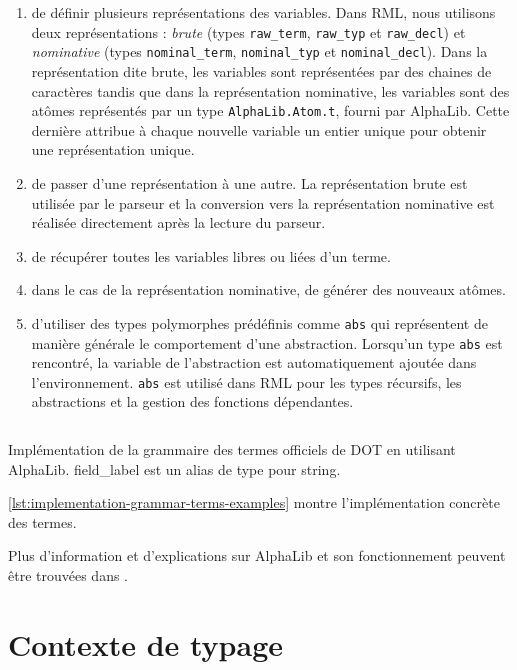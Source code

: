 \begin{enumerate}
  \item de définir plusieurs représentations des variables. Dans RML, nous utilisons deux
  représentations : \textit{brute} (types \verb|raw_term|,
  \verb|raw_typ| et \verb|raw_decl|) et \textit{nominative}
  (types \verb|nominal_term|, \verb|nominal_typ| et \verb|nominal_decl|). Dans la
  représentation dite brute, les variables sont représentées par des chaines de
  caractères tandis que dans la représentation nominative, les variables sont
  des atômes représentés par un type \verb|AlphaLib.Atom.t|, fourni par
  AlphaLib. Cette dernière attribue à chaque nouvelle variable un entier
  unique pour obtenir une représentation unique.
\item de passer d'une représentation à une autre. La représentation brute est
  utilisée par le parseur et la conversion vers la représentation nominative est
  réalisée directement après la lecture du parseur.
\item de récupérer toutes les variables libres ou liées d'un terme.
\item dans le cas de la représentation nominative, de générer des nouveaux atômes.
\item d'utiliser des types polymorphes prédéfinis comme \verb|abs| qui représentent de manière générale
  le comportement d'une abstraction. Lorsqu'un type \verb|abs|
  est rencontré, la variable de l'abstraction est automatiquement ajoutée dans
  l'environnement. \verb|abs| est utilisé dans RML pour les types récursifs,
  les abstractions et la gestion des fonctions dépendantes.
\end{enumerate}

\begin{listing}
  \inputminted{OCaml}{codes/grammar.ml}
  \caption{Implémentation de la grammaire des termes officiels de DOT en
    utilisant AlphaLib. field\_label est un alias de type pour string.}
  \label{lst:implementation-grammar-terms-examples}
\end{listing}

\ref{lst:implementation-grammar-terms-examples} montre l'implémentation
concrète des termes.

Plus d'information et d'explications sur AlphaLib et son fonctionnement peuvent
être trouvées dans \cite{alphalib-paper}.

\section{Contexte de typage}

